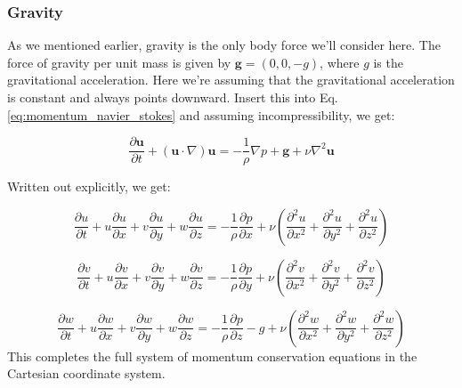 \documentclass[12pt]{article}
\numberwithin{equation}{section}
\numberwithin{figure}{section}
\numberwithin{table}{section}
\begin{document}
\subsubsection{Gravity}

As we mentioned earlier, gravity is the only body force we'll consider here.
The force of gravity per unit mass is given by $\mathbf{g} = (0, 0, -g)$,
where $g$ is the gravitational acceleration.
Here we're assuming that the gravitational acceleration is constant and always
points downward.
Insert this into Eq. \ref{eq:momentum_navier_stokes} and assuming
incompressibility, we get:

\begin{equation}
  \frac{\partial \mathbf{u}}{\partial t} + (\mathbf{u} \cdot \nabla) \mathbf{u} =
  - \frac{1}{\rho} \nabla p + \mathbf{g} + \nu \nabla^2 \mathbf{u}
\end{equation}

Written out explicitly, we get:

\begin{equation}
  \frac{\partial u}{\partial t} + 
  u \frac{\partial u}{\partial x} + 
  v \frac{\partial u}{\partial y} + 
  w \frac{\partial u}{\partial z} = 
  - \frac{1}{\rho} \frac{\partial p}{\partial x} + \nu \left( \frac{\partial^2 u}{\partial x^2} + \frac{\partial^2 u}{\partial y^2} + \frac{\partial^2 u}{\partial z^2} \right)
\end{equation}

\begin{equation}
  \frac{\partial v}{\partial t} + 
  u \frac{\partial v}{\partial x} + 
  v \frac{\partial v}{\partial y} + 
  w \frac{\partial v}{\partial z} = 
  - \frac{1}{\rho} \frac{\partial p}{\partial y} + \nu \left( \frac{\partial^2 v}{\partial x^2} + \frac{\partial^2 v}{\partial y^2} + \frac{\partial^2 v}{\partial z^2} \right)
\end{equation}

\begin{equation}
  \frac{\partial w}{\partial t} + 
  u \frac{\partial w}{\partial x} + 
  v \frac{\partial w}{\partial y} + 
  w \frac{\partial w}{\partial z} = 
  - \frac{1}{\rho} \frac{\partial p}{\partial z} - g + \nu \left( \frac{\partial^2 w}{\partial x^2} + \frac{\partial^2 w}{\partial y^2} + \frac{\partial^2 w}{\partial z^2} \right)
  \label{eq:momentum_navier_stokes_scalar_w}
\end{equation}
This completes the full system of momentum conservation equations in the
Cartesian coordinate system.
\end{document}
